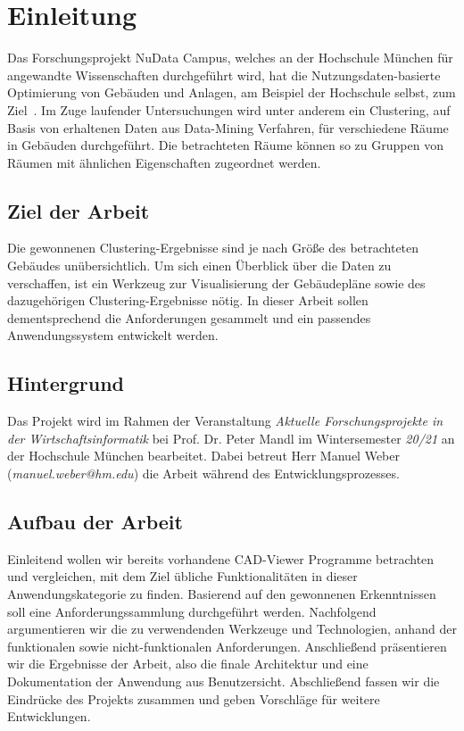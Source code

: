 \section{Einleitung}
\label{sec:introduction}

Das Forschungsprojekt \glqq{}NuData Campus\grqq{}, welches an der Hochschule München für angewandte Wissenschaften durchgeführt wird, hat die Nutzungsdaten-basierte Optimierung von Gebäuden und Anlagen, am Beispiel der Hochschule selbst, zum Ziel~\cite{NuDataCampus}.
Im Zuge laufender Untersuchungen wird unter anderem ein Clustering, auf Basis von erhaltenen Daten aus Data-Mining Verfahren, für verschiedene Räume in Gebäuden durchgeführt.
Die betrachteten Räume können so zu Gruppen von Räumen mit ähnlichen Eigenschaften zugeordnet werden.

\subsection{Ziel der Arbeit}
\label{subsec:purpose}

Die gewonnenen Clustering-Ergebnisse sind je nach Größe des betrachteten Gebäudes unübersichtlich.
Um sich einen Überblick über die Daten zu verschaffen, ist ein Werkzeug zur Visualisierung der Gebäudepläne sowie des dazugehörigen Clustering-Ergebnisse nötig.
In dieser Arbeit sollen dementsprechend die Anforderungen gesammelt und ein passendes Anwendungssystem entwickelt werden.

\subsection{Hintergrund}
\label{subsec:background}

Das Projekt wird im Rahmen der Veranstaltung \textit{\glqq{}Aktuelle Forschungsprojekte in der Wirtschaftsinformatik\grqq{}} bei Prof. Dr. Peter Mandl im Wintersemester \textit{20/21} an der Hochschule München bearbeitet.
Dabei betreut Herr Manuel Weber (\textit{manuel.weber@hm.edu}) die Arbeit während des Entwicklungsprozesses.

\subsection{Aufbau der Arbeit}
\label{subsec:structure}

Einleitend wollen wir bereits vorhandene CAD-Viewer Programme betrachten und vergleichen, mit dem Ziel übliche Funktionalitäten in dieser Anwendungskategorie zu finden.
Basierend auf den gewonnenen Erkenntnissen soll eine Anforderungssammlung durchgeführt werden.
Nachfolgend argumentieren wir die zu verwendenden Werkzeuge und Technologien, anhand der funktionalen sowie nicht-funktionalen Anforderungen.
Anschließend präsentieren wir die Ergebnisse der Arbeit, also die finale Architektur und eine Dokumentation der Anwendung aus Benutzersicht.
Abschließend fassen wir die Eindrücke des Projekts zusammen und geben Vorschläge für weitere Entwicklungen.
